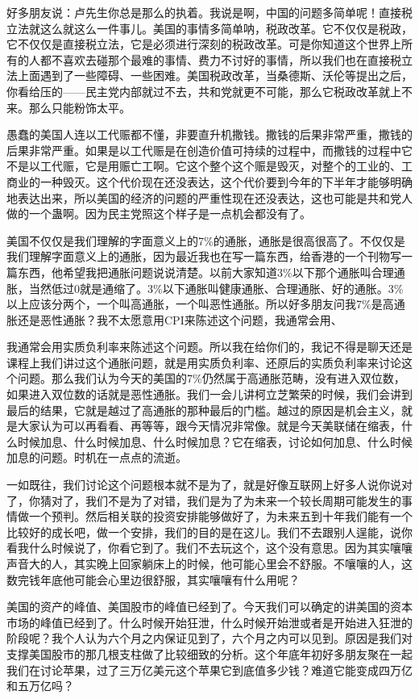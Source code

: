\documentclass[UTF8, 12pt, a4paper]{ctexrep}
\begin{document}
好多朋友说：卢先生你总是那么的执着。我说是啊，中国的问题多简单呢！直接税立法就这么就这么一件事儿。美国的事情多简单呐，税政改革。它不仅仅是税政，它不仅仅是直接税立法，它是必须进行深刻的税政改革。可是你知道这个世界上所有的人都不喜欢去碰那个最难的事情、费力不讨好的事情，所以我们也在直接税立法上面遇到了一些障碍、一些困难。美国税政改革，当桑德斯、沃伦等提出之后，你看给压的——民主党内部就过不去，共和党就更不可能，那么它税政改革就上不来。那么只能粉饰太平。

愚蠢的美国人连以工代赈都不懂，非要直升机撒钱。撒钱的后果非常严重，撒钱的后果非常严重。如果是以工代赈是在创造价值可持续的过程中，而撒钱的过程中它不是以工代赈，它是用赈亡工啊。它这个整个这个赈是毁灭，对整个的工业的、工商业的一种毁灭。这个代价现在还没表达，这个代价要到今年的下半年才能够明确地表达出来，所以美国的经济的问题的严重性现在还没表达，这也可能是共和党人做的一个蛊啊。因为民主党照这个样子是一点机会都没有了。

美国不仅仅是我们理解的字面意义上的7\%的通胀，通胀是很高很高了。不仅仅是我们理解字面意义上的通胀，因为最近我也在写一篇东西，给香港的一个刊物写一篇东西，他希望我把通胀问题说说清楚。以前大家知道3\%以下那个通胀叫合理通胀，当然低过0就是通缩了。3\%以下通胀叫健康通胀、合理通胀、好的通胀。3\%以上应该分两个，一个叫高通胀，一个叫恶性通胀。所以好多朋友问我7\%是高通胀还是恶性通胀？我不太愿意用CPI来陈述这个问题，我通常会用、

我通常会用实质负利率来陈述这个问题。所以我在给你们的，我记不得是聊天还是课程上我们讲过这个通胀问题，就是用实质负利率、还原后的实质负利率来讨论这个问题。那么我们认为今天的美国的7\%仍然属于高通胀范畴，没有进入双位数，如果进入双位数的话就是恶性通胀。我们一会儿讲柯立芝繁荣的时候，我们会讲到最后的结果，它就是越过了高通胀的那种最后的门槛。越过的原因是机会主义，就是大家认为可以再看看、再等等，跟今天情况非常像。就是今天美联储在缩表，什么时候加息、什么时候加息、什么时候加息？它在缩表，讨论如何加息、什么时候加息的问题。时机在一点点的流逝。

一如既往，我们讨论这个问题根本就不是为了，就是好像互联网上好多人说你说对了，你猜对了，我们不是为了对错，我们是为了为未来一个较长周期可能发生的事情做一个预判。然后相关联的投资安排能够做好了，为未来五到十年我们能有一个比较好的成长吧，做一个安排，我们的目的是在这儿。我们不去跟别人逞能，说你看我什么时候说了，你看它到了。我们不去玩这个，这个没有意思。因为其实嚷嚷声音大的人，其实晚上回家躺床上的时候，他可能心里会不舒服。不嚷嚷的人，这数完钱年底他可能会心里边很舒服，其实嚷嚷有什么用呢？

美国的资产的峰值、美国股市的峰值已经到了。今天我们可以确定的讲美国的资本市场的峰值已经到了。什么时候开始狂泄，什么时候开始泄或者是开始进入狂泄的阶段呢？我个人认为六个月之内保证见到了，六个月之内可以见到。原因是我们对支撑美国股市的那几根支柱做了比较细致的分析。这个年底年初好多朋友聚在一起我们在讨论苹果，过了三万亿美元这个苹果它到底值多少钱？难道它能变成四万亿和五万亿吗？
\end{document}
